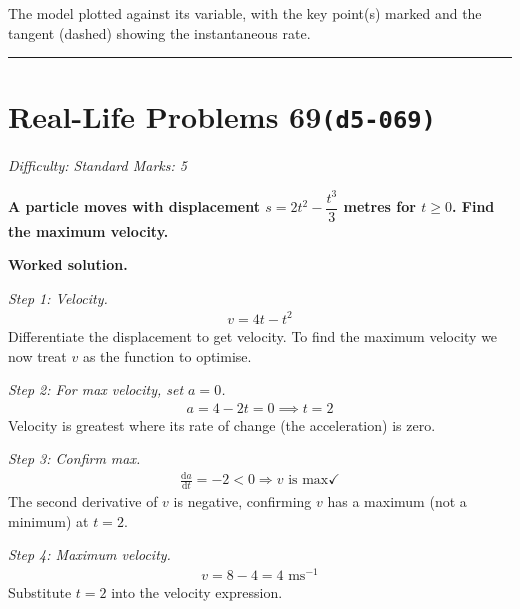 \documentclass[11pt]{article}
\newcommand{\question}[1]{\par\medskip\noindent\textbf{#1}\par}
\begin{document}
\begin{center}
{
}
\end{center}
\small The model plotted against its variable, with the key point(s) marked and the tangent (dashed) showing the instantaneous rate.\normalsize

\medskip\hrule

\section*{Real-Life Problems 69\quad\small\texttt{(d5-069)}}
\textit{Difficulty: Standard \quad\textbar\quad Marks: 5}

\question{A particle moves with displacement \( s = 2t^2 - \dfrac{t^3}{3} \) metres for \( t \ge 0 \). Find the maximum velocity.}

\textbf{Worked solution.}

\textit{Step 1: Velocity.}
\[\begin{gathered}
v = 4t - t^2
\end{gathered}\]
Differentiate the displacement to get velocity. To find the maximum velocity we now treat \( v \) as the function to optimise.

\textit{Step 2: For max velocity, set \( a = 0 \).}
\[\begin{gathered}
a = 4 - 2t = 0 \implies t = 2
\end{gathered}\]
Velocity is greatest where its rate of change (the acceleration) is zero.

\textit{Step 3: Confirm max.}
\[\begin{gathered}
\frac{\mathrm{d}a}{\mathrm{d}t} = -2 < 0 \Rightarrow v \text{ is max} \checkmark
\end{gathered}\]
The second derivative of \( v \) is negative, confirming \( v \) has a maximum (not a minimum) at \( t = 2 \).

\textit{Step 4: Maximum velocity.}
\[\begin{gathered}
v = 8 - 4 = 4 \text{ ms}^{-1}
\end{gathered}\]
Substitute \( t = 2 \) into the velocity expression.
\end{document}
